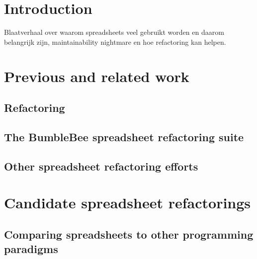 \documentclass[12pt,a4paper,onecolumn,oneside]{memoir}
\begin{document}


\cleardoublepage

\tableofcontents*

\clearpage


\chapter{Introduction}
Blaatverhaal over waarom spreadsheets veel gebruikt worden en daarom belangrijk zijn, maintainability nightmare en hoe refactoring kan helpen.



\chapter{Previous and related work}

\section{Refactoring}

\section{The BumbleBee spreadsheet refactoring suite}

\section{Other spreadsheet refactoring efforts}


\chapter{Candidate spreadsheet refactorings}

\section{Comparing spreadsheets to other programming paradigms}
\end{document}

